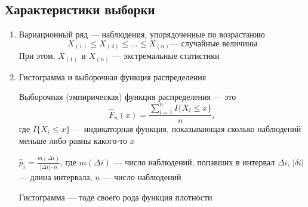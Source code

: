 \documentclass[a4paper, 10pt]{article}
\begin{document}
\subsection{Характеристики выборки}
\begin{enumerate}
    \item Вариационный ряд — наблюдения, упорядоченные по возрастанию
    \begin{equation*}
        X_{(1)}\leqslant X_{(2)}\leqslant\ldots\leqslant X_{(n)}\text{— случайные величины}
    \end{equation*}
    При этом, $X_{(1)}$ и $X_{(n)}$ — экстремальные статистики

    \item Гистограмма и выборочная функция распределения
    
     Выборочная (эмпирическая) функция распределения — это $$\hat{F}_n(x)=\displaystyle\frac{\sum_{i=1}^{n}I\{X_i\leqslant x\}}{n},$$ где $I\{X_i\leqslant x\}$ — индикаторная функция, показывающая сколько наблюдений меньше либо равны какого-то $x$

     $\hat{p}_i=\displaystyle\frac{m(\Delta i)}{|\Delta i|\cdot n}$, где $m(\Delta i)$ — число наблюдений, попавших в интервал $\Delta i$, $|\delta i|$ — длина интервала, $n$ — число наблюдений

    Гистограмма — тоде своего рода функция плотности
\end{enumerate}
\end{document}
